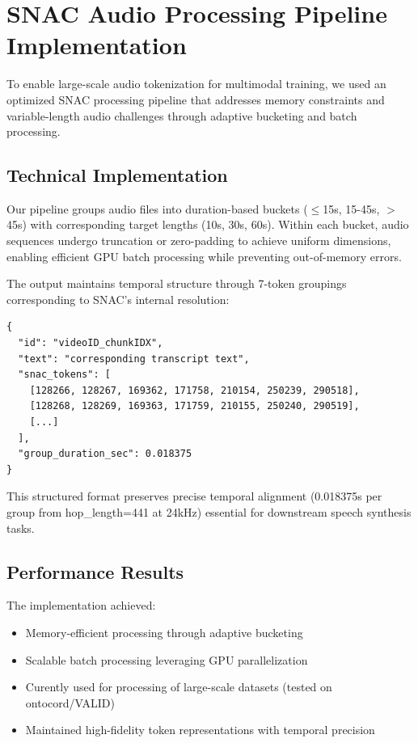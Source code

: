 \section{SNAC Audio Processing Pipeline Implementation}
\label{app:snac_pipeline}
To enable large-scale audio tokenization for multimodal training, we used an optimized SNAC processing pipeline that addresses memory constraints and variable-length audio challenges through adaptive bucketing and batch processing.

\subsection{Technical Implementation}
Our pipeline groups audio files into duration-based buckets ($\leq$15s, 15-45s, $>$45s) with corresponding target lengths (10s, 30s, 60s). Within each bucket, audio sequences undergo truncation or zero-padding to achieve uniform dimensions, enabling efficient GPU batch processing while preventing out-of-memory errors.

The output maintains temporal structure through 7-token groupings corresponding to SNAC's internal resolution:

\begin{verbatim}
{
  "id": "videoID_chunkIDX",
  "text": "corresponding transcript text",
  "snac_tokens": [
    [128266, 128267, 169362, 171758, 210154, 250239, 290518],
    [128268, 128269, 169363, 171759, 210155, 250240, 290519],
    [...]
  ],
  "group_duration_sec": 0.018375
}
\end{verbatim}

This structured format preserves precise temporal alignment (0.018375s per group from hop\_length=441 at 24kHz) essential for downstream speech synthesis tasks.

\subsection{Performance Results}
The implementation achieved:
\begin{itemize}
\item Memory-efficient processing through adaptive bucketing
\item Scalable batch processing leveraging GPU parallelization  
\item Curently used for processing of large-scale datasets (tested on ontocord/VALID)
\item Maintained high-fidelity token representations with temporal precision
\end{itemize}
